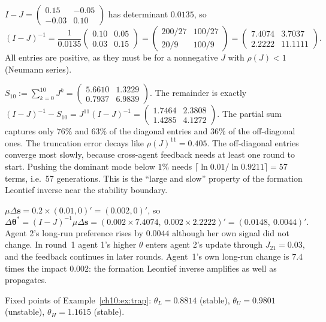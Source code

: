 \documentclass[../solutions_manual.tex]{subfiles}
\begin{document}
 $I - J = \begin{pmatrix} 0.15 & -0.05 \\ -0.03 & 0.10\end{pmatrix}$ has determinant $0.0135$, so
\[
(I - J)^{-1} = \frac{1}{0.0135}\begin{pmatrix} 0.10 & 0.05 \\ 0.03 & 0.15\end{pmatrix}
= \begin{pmatrix} 200/27 & 100/27 \\ 20/9 & 100/9\end{pmatrix}
= \begin{pmatrix} 7.4074 & 3.7037 \\ 2.2222 & 11.1111\end{pmatrix}.
\]
All entries are positive, as they must be for a nonnegative $J$ with $\rho(J) < 1$ (Neumann series).

 $S_{10} := \sum_{k=0}^{10}J^k = \begin{pmatrix} 5.6610 & 1.3229 \\ 0.7937 & 6.9839\end{pmatrix}$. The remainder is exactly $(I-J)^{-1} - S_{10} = J^{11}(I-J)^{-1} = \begin{pmatrix} 1.7464 & 2.3808 \\ 1.4285 & 4.1272\end{pmatrix}$. The partial sum captures only $76\%$ and $63\%$ of the diagonal entries and $36\%$ of the off-diagonal ones. The truncation error decays like $\rho(J)^{11} = 0.405$. The off-diagonal entries converge most slowly, because cross-agent feedback needs at least one round to start. Pushing the dominant mode below $1\%$ needs $\lceil\ln 0.01/\ln 0.9211\rceil = 57$ terms, i.e.\ 57 generations. This is the ``large and slow'' property of the formation Leontief inverse near the stability boundary.

 $\mu\Delta\mathbf{s} = 0.2\times(0.01, 0)' = (0.002, 0)'$, so
\[
\Delta\boldsymbol{\theta}^* = (I-J)^{-1}\mu\Delta\mathbf{s} = (0.002\times 7.4074,\ 0.002\times 2.2222)' = (0.0148,\ 0.0044)'.
\]
Agent 2's long-run preference rises by $0.0044$ although her own signal did not change. In round~1 agent 1's higher $\theta$ enters agent 2's update through $J_{21} = 0.03$, and the feedback continues in later rounds. Agent~1's own long-run change is $7.4$ times the impact $0.002$: the formation Leontief inverse amplifies as well as propagates.

Fixed points of Example~\ref{ch10:ex:trap}: $\theta_L = 0.8814$ (stable), $\theta_U = 0.9801$ (unstable), $\theta_H = 1.1615$ (stable).
\end{document}
